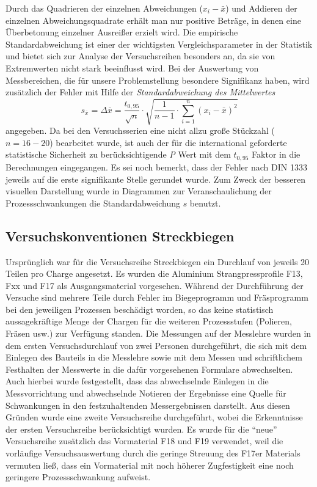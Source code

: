 \documentclass[12pt,a4paper,parskip,twoside,BCOR5mm,headsepline]{scrartcl}
\begin{document}
Durch das Quadrieren der einzelnen Abweichungen ($ x_i-\bar{x}$) und Addieren der einzelnen Abweichungsquadrate erhält man nur positive Beträge, in denen eine Überbetonung einzelner Ausreißer erzielt wird.
Die empirische Standardabweichung ist   einer der wichtigsten Vergleichsparameter in der Statistik und bietet sich zur Analyse der Versuchsreihen besonders an, da sie von Extremwerten nicht stark beeinflusst wird. \autocite[54]{gst}  Bei der Auswertung von Messbereichen, die für unsere Problemstellung besondere Signifikanz haben, wird zusätzlich der Fehler mit Hilfe der  \emph{Standardabweichung des Mittelwertes }  \begin{equation}s_{\bar{x}}= \Delta\bar{x}=\frac{t_{0,95}}{\sqrt{n}} \cdot \sqrt{\frac{1}{n-1} \cdot \sum \limits_{i=1}^n (x_i - \bar{x})^2 }\end{equation}  angegeben. 
\autocite[16]{ph} Da bei den Versuchsserien eine nicht allzu große Stückzahl ($ n=16-20 $) bearbeitet wurde,  ist auch der für die international geforderte statistische Sicherheit zu berücksichtigende \emph{P} Wert mit dem $ t_{0,95} $ Faktor in die Berechnungen eingegangen. 
 \autocite[609]{tp}  Es sei noch bemerkt, dass der Fehler nach DIN 1333 jeweils auf die erste signifikante Stelle gerundet wurde. \autocite[612]{tp}
Zum Zweck der besseren visuellen Darstellung wurde in Diagrammen zur Veranschaulichung der Prozessschwankungen die Standardabweichung $s$ benutzt.
 	 	
 	

 	
\subsection{Versuchskonventionen Streckbiegen}
Ursprünglich war für die Versuchsreihe Streckbiegen ein Durchlauf von jeweils 20 Teilen pro Charge angesetzt. Es wurden die Aluminium Strangpressprofile F13, Fxx und F17 als Ausgangsmaterial vorgesehen. Während der Durchführung der Versuche sind mehrere Teile durch Fehler im Biegeprogramm und Fräsprogramm bei den jeweiligen Prozessen beschädigt worden, so das keine statistisch aussagekräftige Menge  der Chargen für die weiteren Prozessstufen (Polieren, Fräsen usw.) zur Verfügung standen. Die Messungen auf der Messlehre wurden in dem ersten Versuchsdurchlauf von zwei Personen durchgeführt, die sich mit dem Einlegen des Bauteils in die Messlehre sowie mit dem Messen und schriftlichem Festhalten der Messwerte in die dafür vorgesehenen Formulare abwechselten. Auch hierbei wurde festgestellt, dass das abwechselnde Einlegen in die Messvorrichtung und abwechselnde Notieren der Ergebnisse eine Quelle für Schwankungen in den festzuhaltenden Messergebnissen darstellt. Aus diesen Gründen wurde eine zweite Versuchsreihe durchgeführt, wobei die Erkenntnisse der ersten Versuchsreihe berücksichtigt wurden. Es wurde für die "`neue"' Versuchsreihe zusätzlich das Vormaterial F18 und F19 verwendet,  weil die vorläufige Versuchsauswertung durch die geringe Streuung des F17er Materials vermuten ließ, dass ein Vormaterial mit noch höherer Zugfestigkeit eine noch geringere Prozessschwankung aufweist.
\end{document}
